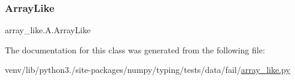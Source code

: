 \subsubsection{\texorpdfstring{Array\+Like}{ArrayLike}}
{\footnotesize\ttfamily array\+\_\+like.\+A.\+Array\+Like\hspace{0.3cm}{\ttfamily [static]}}



The documentation for this class was generated from the following file\+:\begin{DoxyCompactItemize}
\item 
venv/lib/python3./site-\/packages/numpy/typing/tests/data/fail/\hyperlink{fail_2array__like_8py}{array\+\_\+like.\+py}\end{DoxyCompactItemize}

